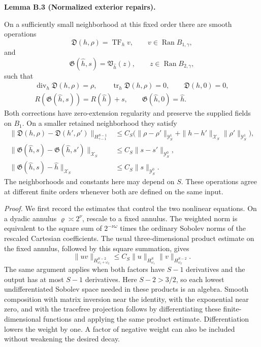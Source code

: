 \documentclass[
  english,
  11pt,
  reqno]{amsart}
\makeatletter
\newcommand{\pandocstatementheading}[1]{%
  \par\addpenalty{\@beginparpenalty}%
  \addvspace{.5\baselineskip plus .2\baselineskip minus .2\baselineskip}%
  {\normalfont\bfseries #1\par}%
  \nobreak\@afterindenttrue\@afterheading
}
\makeatother
\begin{document}
\pandocstatementheading{\leavevmode{}\label{lem:online-extension-normalized-repairs}Lemma B.3 (Normalized exterior repairs).}

On a sufficiently small neighborhood at this fixed order there are
smooth operations \[
\mathfrak D(h,\rho)=\operatorname{TF}_h v,\qquad
v\in\operatorname{Ran}B_{1,\gamma},
\] and \[
\mathfrak G(\widehat h,s)
=\mathfrak V_{\widehat h}(z),\qquad
z\in\operatorname{Ran}B_{2,\gamma},
\] such that \[
\begin{gathered}
\operatorname{div}_h\mathfrak D(h,\rho)=\rho,\qquad
\operatorname{tr}_h\mathfrak D(h,\rho)=0,\qquad
\mathfrak D(h,0)=0,\\
R(\mathfrak G(\widehat h,s))=R(\widehat h)+s,\qquad
\mathfrak G(\widehat h,0)=\widehat h.
\end{gathered}
\] Both corrections have zero-extension regularity and preserve the
supplied fields on \(B_1\). On a smaller retained neighborhood they
satisfy \[
\begin{aligned}
\|\mathfrak D(h,\rho)-\mathfrak D(h',\rho')\|_{H^{S-1}_{\gamma-1}}
&\le C_S\bigl(
\|\rho-\rho'\|_{\mathcal Y_S^1}
+\|h-h'\|_{\mathcal X_S}\|\rho'\|_{\mathcal Y_S^1}\bigr),\\
\|\mathfrak G(\widehat h,s)-\mathfrak G(\widehat h,s')\|_{\mathcal X_S}
&\le C_S\|s-s'\|_{\mathcal Y_S^0},\\
\|\mathfrak G(\widehat h,s)-\widehat h\|_{\mathcal X_S}
&\le C_S\|s\|_{\mathcal Y_S^0}.
\end{aligned}
\] The neighborhoods and constants here may depend on \(S\). These
operations agree at different finite orders whenever both are defined on
the same input.

\emph{Proof.} We first record the estimates that control the two
nonlinear equations. On a dyadic annulus \(\varrho\asymp 2^\nu\),
rescale to a fixed annulus. The weighted norm is equivalent to the
square sum of \(2^{-\nu\omega}\) times the ordinary Sobolev norms of the
rescaled Cartesian coefficients. The usual three-dimensional product
estimate on the fixed annulus, followed by this square summation, gives
\[
\|uv\|_{H^{S-2}_{\omega_1+\omega_2}}
\le C_S\|u\|_{H^S_{\omega_1}}
\|v\|_{H^{S-2}_{\omega_2}}.
\] The same argument applies when both factors have \(S-1\) derivatives
and the output has at most \(S-1\) derivatives. Here \(S-2>3/2\), so
each lowest undifferentiated Sobolev space needed in these products is
an algebra. Smooth composition with matrix inversion near the identity,
with the exponential near zero, and with the tracefree projection
follows by differentiating these finite-dimensional functions and
applying the same product estimate. Differentiation lowers the weight by
one. A factor of negative weight can also be included without weakening
the desired decay.
\end{document}
